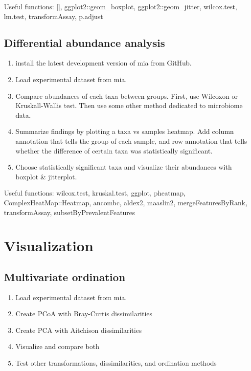 \documentclass[
]{book}
\providecommand{\tightlist}{%
  \setlength{\itemsep}{0pt}\setlength{\parskip}{0pt}}
\begin{document}
Useful functions: {[}{]}, ggplot2::geom\_boxplot, ggplot2::geom\_jitter, wilcox.test, lm.test, transformAssay, p.adjust

\hypertarget{differential-abundance-analysis-1}{%
\subsection{Differential abundance analysis}\label{differential-abundance-analysis-1}}

\begin{enumerate}
\def\labelenumi{\arabic{enumi}.}
\tightlist
\item
  install the latest development version of mia from GitHub.
\item
  Load experimental dataset from mia.
\item
  Compare abundances of each taxa between groups. First, use Wilcoxon or Kruskall-Wallis test. Then use some other method dedicated to microbiome data.
\item
  Summarize findings by plotting a taxa vs samples heatmap. Add column annotation that tells the group of each sample, and row annotation that tells whether the difference of certain taxa was statistically significant.
\item
  Choose statistically significant taxa and visualize their abundances with boxplot \& jitterplot.
\end{enumerate}

Useful functions: wilcox.test, kruskal.test, ggplot, pheatmap, ComplexHeatMap::Heatmap, ancombc, aldex2, maaslin2, mergeFeaturesByRank, transformAssay, subsetByPrevalentFeatures

\hypertarget{visualization-2}{%
\section{Visualization}\label{visualization-2}}

\hypertarget{multivariate-ordination}{%
\subsection{Multivariate ordination}\label{multivariate-ordination}}

\begin{enumerate}
\def\labelenumi{\arabic{enumi}.}
\tightlist
\item
  Load experimental dataset from mia.
\item
  Create PCoA with Bray-Curtis dissimilarities
\item
  Create PCA with Aitchison dissimilarities
\item
  Visualize and compare both
\item
  Test other transformations, dissimilarities, and ordination methods
\end{enumerate}
\end{document}
